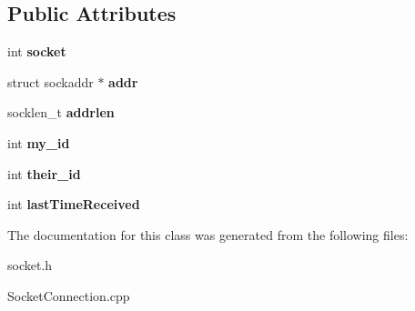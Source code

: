 \subsection*{Public Attributes}
\begin{DoxyCompactItemize}
\item 
\hypertarget{class_socket_connection_a78542e99c250d924140fe2271d711313}{int {\bfseries socket}}\label{class_socket_connection_a78542e99c250d924140fe2271d711313}

\item 
\hypertarget{class_socket_connection_af73ff63ab5495a54d85cf79116813e3e}{struct sockaddr $\ast$ {\bfseries addr}}\label{class_socket_connection_af73ff63ab5495a54d85cf79116813e3e}

\item 
\hypertarget{class_socket_connection_ac7f072570d145c74d0967bc23af70c35}{socklen\-\_\-t {\bfseries addrlen}}\label{class_socket_connection_ac7f072570d145c74d0967bc23af70c35}

\item 
\hypertarget{class_socket_connection_a4e1c9b6752bcc6c529da8482d7fbc0ae}{int {\bfseries my\-\_\-id}}\label{class_socket_connection_a4e1c9b6752bcc6c529da8482d7fbc0ae}

\item 
\hypertarget{class_socket_connection_a556ea09be6e8dff92ad2917cdf450209}{int {\bfseries their\-\_\-id}}\label{class_socket_connection_a556ea09be6e8dff92ad2917cdf450209}

\item 
\hypertarget{class_socket_connection_a7bdff9cb938e49246e34db8918088088}{int {\bfseries last\-Time\-Received}}\label{class_socket_connection_a7bdff9cb938e49246e34db8918088088}

\end{DoxyCompactItemize}


The documentation for this class was generated from the following files\-:\begin{DoxyCompactItemize}
\item 
socket.\-h\item 
Socket\-Connection.\-cpp\end{DoxyCompactItemize}
